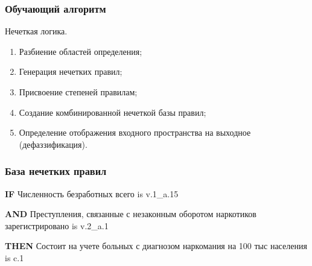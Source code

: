 \documentclass[t]{beamer}  %
\begin{document}
\begin{frame}
    \frametitle{Обучающий алгоритм} 
	\begin{block}{Нечеткая логика. }
        \begin{enumerate}
            \item Разбиение областей определения;
            \item Генерация нечетких правил;
            \item Присвоение степеней правилам;
            \item Создание комбинированной нечеткой базы правил;
            \item Определение отображения входного пространства на выходное
                (дефаззификация).
        \end{enumerate}
	\end{block}

\end{frame}
\begin{frame}
    \frametitle{База нечетких правил}
    \textbf{IF} Численность безработных всего is \alert{v.1\_a.15} 
    
    \textbf{AND} Преступления, связанные с незаконным оборотом наркотиков зарегистрировано is
    \alert{v.2\_a.1} 

    \textbf{THEN} Состоит на учете больных с диагнозом наркомания на 100 тыс населения is
    \alert{c.1}
\end{frame}
\end{document}
